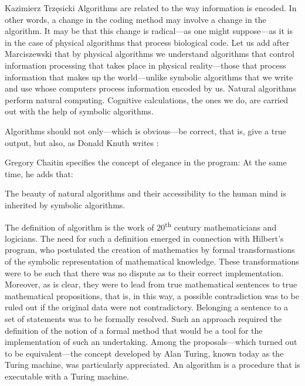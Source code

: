 \begin{artengenv}{Kazimierz Trzęsicki}
Algorithms are related to the way information is encoded. In other words, a change in the coding method may involve a change in the algorithm. It may be that this change is radical---as one might suppose---as it is in the case of physical algorithms that process biological code. Let us add after Marciszewski \parencite*[p.199--200]{MarciszewskiStacewicz2011} that by physical algorithms we understand algorithms that control information processing that takes place in physical reality---those that process information that makes up the world---unlike symbolic algorithms that we write and use whose computers process information encoded by us. Natural algorithms perform natural computing. Cognitive calculations, the ones we do, are carried out with the help of symbolic algorithms.


Algorithms should not only---which is obvious---be correct, that is, give a true output, but also, as Donald Knuth writes \parencite*[p.7]{Knuth1997}: 


Gregory Chaitin \parencite*[p.27] {Chaitin2005} specifies the concept of elegance in the program:  At the same time, he adds that: 

The beauty of natural algorithms and their accessibility to the human mind is inherited by symbolic algorithms.


The definition of  algorithm is the work of 20\textsuperscript{th} century mathematicians and logicians. The need for such a definition emerged in connection with Hilbert's program, who postulated the creation of mathematics by formal transformations of the symbolic representation of mathematical knowledge. These transformations were to be such that there was no dispute as to their correct implementation. Moreover, as is clear, they were to lead from true mathematical sentences to true mathematical propositions, that is, in this way, a possible contradiction was to be ruled out if the original data were not contradictory. Belonging a sentence to a set of statements was to be formally resolved. Such an approach required the definition of the notion of a formal method that would be a tool for the implementation of such an undertaking. Among the proposals---which turned out to be equivalent---the concept developed by Alan Turing, known today as the Turing machine, was particularly appreciated. An algorithm is a procedure that is executable with a Turing machine.


\end{artengenv}

